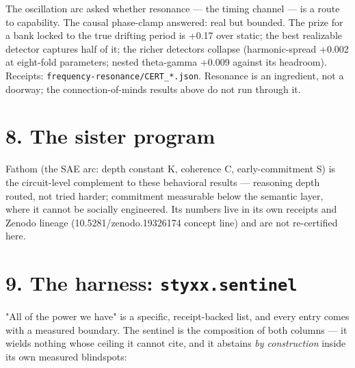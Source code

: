 \documentclass[11pt]{article}
\begin{document}
The oscillation arc asked whether resonance --- the timing channel --- is a route to capability. The causal phase-clamp answered: real but bounded. The prize for a bank locked to the true drifting period is +0.17 over static; the best realizable detector captures half of it; the richer detectors collapse (harmonic-spread +0.002 at eight-fold parameters; nested theta-gamma +0.009 against its headroom). Receipts: \texttt{frequency-resonance/CERT\_*.json}. Resonance is an ingredient, not a doorway; the connection-of-minds results above do not run through it.

\section{8. The sister program}\label{8-the-sister-program}

Fathom (the SAE arc: depth constant K, coherence C, early-commitment S) is the circuit-level complement to these behavioral results --- reasoning depth routed, not tried harder; commitment measurable below the semantic layer, where it cannot be socially engineered. Its numbers live in its own receipts and Zenodo lineage (10.5281/zenodo.19326174 concept line) and are not re-certified here.

\section{\texorpdfstring{9. The harness: \texttt{styxx.sentinel}}{9. The harness: styxx.sentinel}}\label{9-the-harness-styxxsentinel}

"All of the power we have" is a specific, receipt-backed list, and every entry comes with a measured boundary. The sentinel is the composition of both columns --- it wields nothing whose ceiling it cannot cite, and it abstains \emph{by construction} inside its own measured blindspots:
\end{document}
